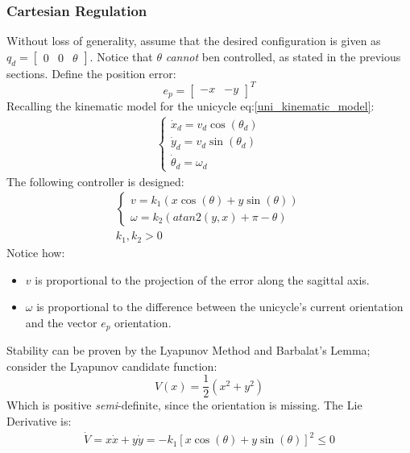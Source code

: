 \subsubsection{Cartesian Regulation}
Without loss of generality, assume that the desired configuration is given as $q_d=\begin{bmatrix} 0 & 0 & \theta \end{bmatrix}$. Notice that $\theta$ \textit{cannot} ben controlled, as stated in the previous sections. Define the position error:
\begin{equation*}
    e_p=
    \begin{bmatrix}
        -x & -y    
    \end{bmatrix}^{T}
\end{equation*}
Recalling the kinematic model for the unicycle eq:\ref{uni_kinematic_model}:
\begin{gather*}
    \begin{cases}
        \dot{x}_d=v_d\cos(\theta_d) \\
        \dot{y}_d=v_d\sin(\theta_d) \\
        \dot{\theta}_d=\omega_d
    \end{cases}
\end{gather*}
The following controller is designed:
\begin{gather*}
    \begin{cases}
        v=k_1(x\cos(\theta)+y\sin(\theta)) \\
        \omega=k_2(atan2(y,x)+\pi-\theta)
    \end{cases} \\
    k_1,k_2>0
\end{gather*}
Notice how:
\begin{itemize}
    \item $v$ is proportional to the projection of the error along the sagittal axis.
    \item $\omega$ is proportional to the difference between the unicycle's current orientation and the vector $e_p$ orientation. 
\end{itemize}
Stability can be proven by the Lyapunov Method and Barbalat's Lemma; consider the Lyapunov candidate function:
\begin{equation*}
    V(x)=\frac{1}{2}\left(x^2+y^2\right)
\end{equation*}
Which is positive \textit{semi}-definite, since the orientation is missing. The Lie Derivative is:
\begin{gather*}
    \dot{V}=x\dot{x}+y\dot{y}=-k_1\left[x\cos(\theta)+y\sin(\theta)\right]^{2}\leq 0
\end{gather*}
